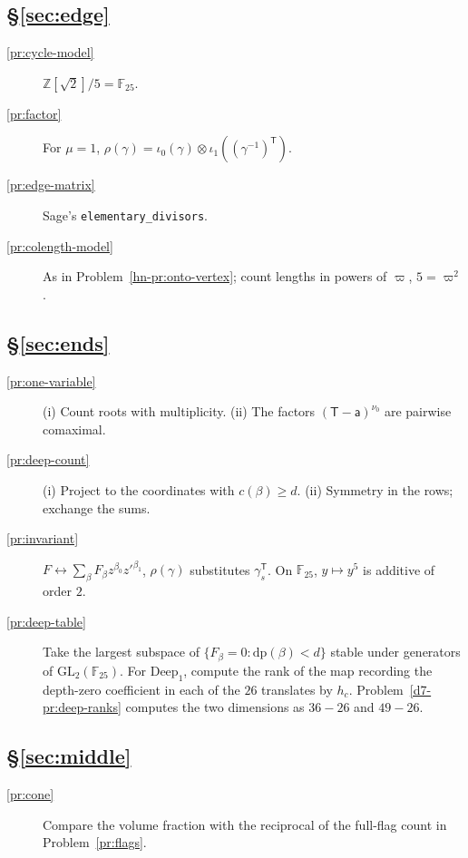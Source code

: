 \documentclass[reqno]{amsart}
\numberwithin{equation}{section}
\theoremstyle{plain}
\theoremstyle{definition}
\theoremstyle{remark}
\newcommand{\Z}{\mathbb{Z}}
\newcommand{\F}{\mathbb{F}}
\newcommand{\GL}{\mathrm{GL}}
\newcommand{\dpt}{\mathrm{dp}}
\newcommand{\Deep}{\mathrm{Deep}}
\begin{document}
\subsection*{\S\ref{sec:edge}}
\begin{description}
\item[\ref{pr:cycle-model}] \(\Z[\sqrt2]/5 = \F_{25}\).
\item[\ref{pr:factor}] For \(\mu = 1\), \(\rho(\gamma) = \iota_0(\gamma) \otimes \iota_1((\gamma^{-1})^{\mathsf T})\).
\item[\ref{pr:edge-matrix}] Sage's \texttt{elementary\_\allowbreak divisors}.
\item[\ref{pr:colength-model}] As in Problem~\ref{hn-pr:onto-vertex}; count lengths in powers of \(\varpi\), \(5 = \varpi^2\).
\end{description}

\subsection*{\S\ref{sec:ends}}
\begin{description}
\item[\ref{pr:one-variable}] (i) Count roots with multiplicity.  (ii) The factors \((\mathsf T - \mathsf a)^{\nu_0}\) are pairwise comaximal.
\item[\ref{pr:deep-count}] (i) Project to the coordinates with \(c(\beta) \ge d\).  (ii) Symmetry in the rows; exchange the sums.
\item[\ref{pr:invariant}] \(F \leftrightarrow \sum_\beta F_\beta z^{\beta_0}z'^{\beta_1}\), \(\rho(\gamma)\) substitutes \(\gamma_s^{\mathsf T}\).  On \(\F_{25}\), \(y \mapsto y^5\) is additive of order \(2\).
\item[\ref{pr:deep-table}] Take the largest subspace of \(\{F_\beta = 0 : \dpt(\beta) < d\}\) stable under generators of \(\GL_2(\F_{25})\).  For \(\Deep_1\), compute the rank of the map recording the depth-zero coefficient in each of the \(26\) translates by \(h_c\).  Problem~\ref{d7-pr:deep-ranks} computes the two dimensions as \(36-26\) and \(49-26\).
\end{description}

\subsection*{\S\ref{sec:middle}}
\begin{description}
\item[\ref{pr:cone}] Compare the volume fraction with the reciprocal of the full-flag count in Problem~\ref{pr:flags}.
\end{description}
\end{document}
